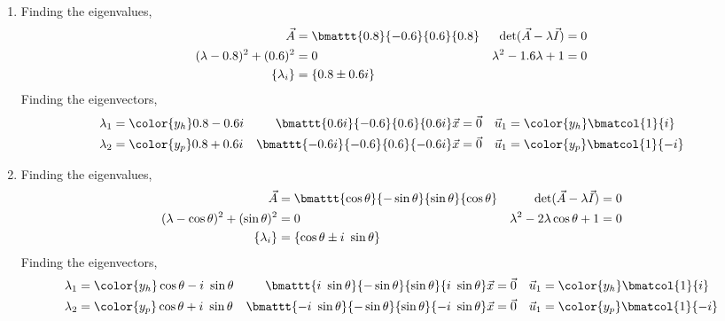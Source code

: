 \begin{enumerate}
    \item Finding the eigenvalues,
          \begin{align}
              \vec{A}                        & = \bmattt{0.8}{-0.6}{0.6}{0.8} &
              \det(\vec{A} - \lambda\vec{I}) & = 0                              \\
              (\lambda - 0.8)^2 + (0.6)^2    & = 0                            &
              \lambda^2 - 1.6 \lambda + 1    & = 0                              \\
              \{\lambda_i\}                  & = \{0.8 \pm 0.6i\}
          \end{align}
          Finding the eigenvectors,
          \begin{align}
              \lambda_1                                & = \color{y_h} 0.8 - 0.6i &
              \bmattt{0.6i}{-0.6}{0.6}{0.6i} \vec{x}   & = \vec{0}                &
              \vec{u}_1                                & = \color{y_h}
              \bmatcol{1}{i}                                                        \\
              \lambda_2                                & = \color{y_p} 0.8 + 0.6i &
              \bmattt{-0.6i}{-0.6}{0.6}{-0.6i} \vec{x} & = \vec{0}                &
              \vec{u}_1                                & = \color{y_p}
              \bmatcol{1}{-i}
          \end{align}

    \item Finding the eigenvalues,
          \begin{align}
              \vec{A}                                   & = \bmattt{\cos \theta}
              {-\sin \theta} {\sin \theta}{\cos \theta} &
              \det(\vec{A} - \lambda\vec{I})            & = 0                      \\
              (\lambda - \cos \theta)^2
              + (\sin \theta)^2                         & = 0                    &
              \lambda^2 - 2\lambda \cos \theta + 1      & = 0                      \\
              \{\lambda_i\}                             & =
              \{\cos \theta \pm i\ \sin \theta\}
          \end{align}
          Finding the eigenvectors,
          \begin{align}
              \lambda_1                              & = \color{y_h}
              \cos \theta - i\ \sin \theta           &
              \bmattt{i\ \sin \theta}{-\sin \theta}
              {\sin \theta}{i\ \sin \theta} \vec{x}  & = \vec{0}     &
              \vec{u}_1                              & = \color{y_h}
              \bmatcol{1}{i}                                           \\
              \lambda_2                              & = \color{y_p}
              \cos \theta + i\ \sin \theta           &
              \bmattt{-i\ \sin \theta}{-\sin \theta}
              {\sin \theta}{-i\ \sin \theta} \vec{x} & = \vec{0}     &
              \vec{u}_1                              & = \color{y_p}
              \bmatcol{1}{-i}
          \end{align}


\end{enumerate}
